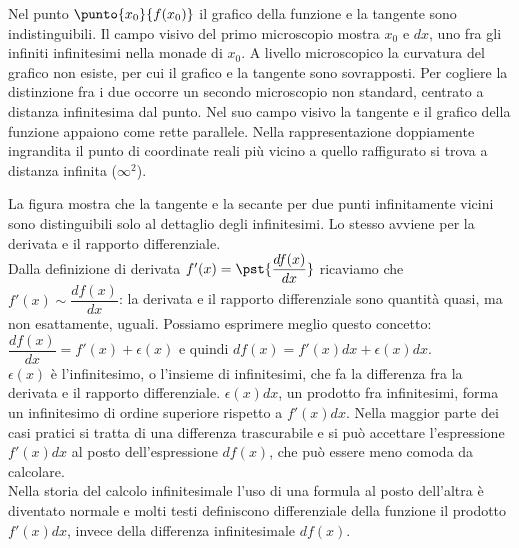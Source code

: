 \begin{inaccessibleblock}
  \begin{minipage}[]{.47\textwidth}
    \begin{center} \derivata \end{center}
 \end{minipage} 
  \hfill
 \begin{minipage}[]{.47\textwidth} \vspace{2.5em}
Nel punto $\punto{x_0}{f(x_0)}$ il grafico della funzione e la tangente
sono indistinguibili. 
Il campo visivo del primo microscopio mostra ${x_0}$ e $dx$, 
uno fra gli infiniti infinitesimi nella monade di $x_0$. A livello 
microscopico la curvatura del grafico non esiste,  per cui il grafico e la 
tangente sono sovrapposti. Per cogliere la distinzione fra i due occorre 
un secondo microscopio non standard, centrato a distanza infinitesima dal 
punto. Nel suo campo visivo la tangente e il grafico della funzione 
appaiono come rette parallele. Nella rappresentazione doppiamente ingrandita
il punto di coordinate reali più vicino a quello raffigurato  si trova a 
distanza infinita ($\infty^2$).
 \end{minipage}
\end{inaccessibleblock}
\label{}
La figura mostra che la tangente e la secante per due punti infinitamente 
vicini sono distinguibili solo al dettaglio degli infinitesimi. Lo 
stesso avviene per la derivata e il rapporto differenziale.\\
Dalla definizione di derivata $f'(x)=\pst{\dfrac{df(x)}{dx}}$ ricaviamo che
$f'(x)\sim \dfrac{df(x)}{dx}$: la derivata e il rapporto differenziale 
sono quantità quasi, ma non esattamente, uguali. Possiamo esprimere 
meglio questo concetto:\\
$\dfrac{df(x)}{dx}=f'(x)+\epsilon(x)$ e quindi 
$df(x)=f'(x)dx+\epsilon(x)dx$.\\
$\epsilon(x)$ è l'infinitesimo, o l'insieme di infinitesimi, che fa la 
differenza fra la derivata e il rapporto differenziale.  
$\epsilon(x)dx$, un prodotto fra infinitesimi, forma un infinitesimo 
di ordine superiore rispetto a $f'(x)dx$.
Nella maggior parte dei casi pratici si tratta di una differenza 
trascurabile 
e si può accettare l'espressione $f'(x)dx$ al posto dell'espressione
$df(x)$, che può essere meno comoda da calcolare.\\
Nella storia del calcolo infinitesimale l'uso di una formula al posto 
dell'altra
è diventato normale e molti testi definiscono differenziale della 
funzione il prodotto $f'(x)dx$, invece della differenza infinitesimale 
$df(x)$.

